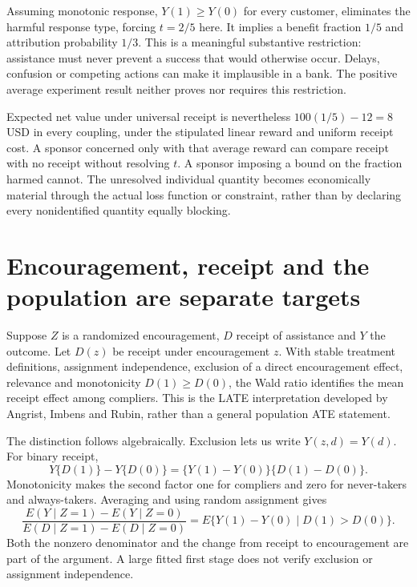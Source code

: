 Assuming monotonic response, $Y(1)\ge Y(0)$ for every customer,
eliminates the harmful response type, forcing $t=2/5$ here.
It implies a benefit fraction $1/5$ and attribution probability
$1/3$. This is a meaningful substantive restriction: assistance
must never prevent a success that would otherwise occur. Delays,
confusion or competing actions can make it implausible in a bank.
The positive average experiment result neither proves nor requires
this restriction.

Expected net value under universal receipt is nevertheless
$100(1/5)-12=8$ USD in every coupling, under the stipulated linear
reward and uniform receipt cost. A sponsor concerned only with
that average reward can compare receipt with no receipt without
resolving $t$. A sponsor imposing a bound on the fraction harmed
cannot. The unresolved individual quantity becomes economically
material through the actual loss function or constraint, rather
than by declaring every nonidentified quantity equally blocking.

\section{Encouragement, receipt and the population are separate targets}
\label{exec17:s3-iv}

Suppose $Z$ is a randomized encouragement, $D$ receipt of assistance
and $Y$ the outcome. Let $D(z)$ be receipt under encouragement
$z$. With stable treatment definitions, assignment independence,
exclusion of a direct encouragement effect, relevance and
monotonicity $D(1)\ge D(0)$, the Wald ratio identifies the mean
receipt effect among compliers. This is the LATE interpretation
developed by Angrist, Imbens and Rubin, rather than a general
population ATE statement.~\citep{angrist1996}

The distinction follows algebraically. Exclusion lets us write
$Y(z,d)=Y(d)$. For binary receipt,
\[
 Y\{D(1)\}-Y\{D(0)\}
   =\{Y(1)-Y(0)\}\{D(1)-D(0)\}.
\]
Monotonicity makes the second factor one for compliers and zero
for never-takers and always-takers. Averaging and using
random assignment gives
\[
 \frac{E(Y\mid Z=1)-E(Y\mid Z=0)}
      {E(D\mid Z=1)-E(D\mid Z=0)}
 =E\{Y(1)-Y(0)\mid D(1)>D(0)\}.
\]
Both the nonzero denominator and the change from receipt to
encouragement are part of the argument. A large fitted first
stage does not verify exclusion or assignment
independence.~\citep{angrist1996}

